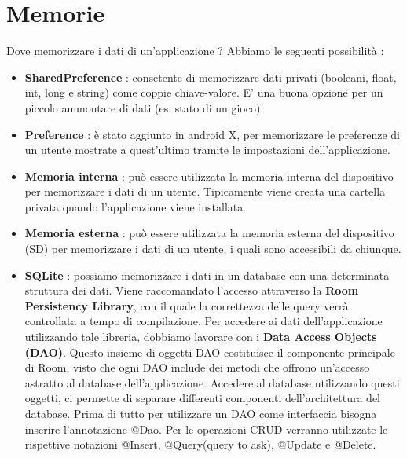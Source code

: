 \documentclass[12pt]{report}
\begin{document}
\chapter{Memorie}
Dove memorizzare i dati di un'applicazione ? Abbiamo le seguenti possibilità :
\begin{itemize}
\item \textbf{SharedPreference} : consetente di memorizzare dati privati (booleani, float, int, long e string) come coppie chiave-valore. E' una buona opzione per un piccolo ammontare di dati (es. stato di un gioco).
\item \textbf{Preference} : è stato aggiunto in android X, per memorizzare le preferenze di un utente mostrate a quest'ultimo tramite le impostazioni dell'applicazione.
\item \textbf{Memoria interna} : può essere utilizzata la memoria interna del dispositivo per memorizzare i dati di un utente. Tipicamente viene creata una cartella privata quando l'applicazione viene installata.
\item \textbf{Memoria esterna} : può essere utilizzata la memoria esterna del dispositivo (SD) per memorizzare i dati di un utente, i quali sono accessibili da chiunque.
\item \textbf{SQLite} : possiamo memorizzare i dati in un database con una determinata struttura dei dati. Viene raccomandato l'accesso attraverso la \textbf{Room Persistency Library}, con il quale la correttezza delle query verrà controllata a tempo di compilazione. Per accedere ai dati dell'applicazione utilizzando tale libreria, dobbiamo lavorare con i \textbf{Data Access Objects (DAO)}. Questo insieme di oggetti DAO costituisce il componente principale di Room, visto che ogni DAO include dei metodi che offrono un'accesso astratto al database dell'applicazione. Accedere al database utilizzando questi oggetti, ci permette di separare differenti componenti dell'architettura del database. Prima di tutto per utilizzare un DAO come interfaccia bisogna inserire l'annotazione @Dao. Per le operazioni CRUD verranno utilizzate le rispettive notazioni @Insert, @Query(query to ask), @Update e @Delete.

\end{itemize}
\end{document}
